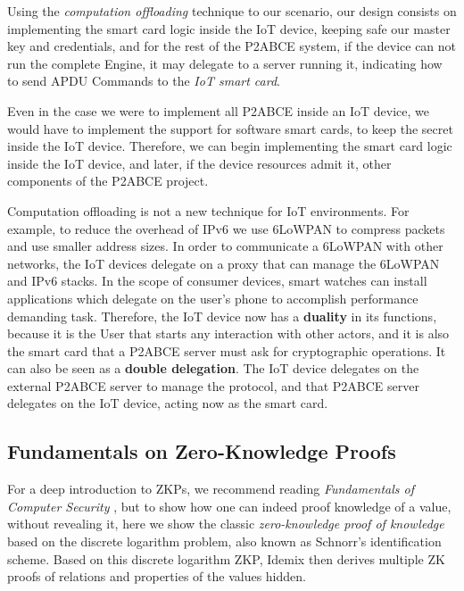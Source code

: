 Using the \textit{computation offloading} technique to our scenario, our design consists on implementing the smart card logic inside the IoT device, keeping safe our master key and credentials, and for the rest of the P2ABCE system, if the device can not run the complete Engine, it may delegate to a server running it, indicating how to send APDU Commands to the \textit{IoT smart card}.

Even in the case we were to implement all P2ABCE inside an IoT device, we would have to implement the support for software smart cards, to keep the secret inside the IoT device. Therefore, we can begin implementing the smart card logic inside the IoT device, and later, if the device resources admit it, other components of the P2ABCE project.


\hfil

Computation offloading is not a new technique for IoT environments. For example, to reduce the overhead of IPv6 we use 6LoWPAN to compress packets and use smaller address sizes. In order to communicate a 6LoWPAN with other networks, the IoT devices delegate on a proxy that can manage the 6LoWPAN and IPv6 stacks. In the scope of consumer devices, smart watches can install applications which delegate on the user's phone to accomplish performance demanding task. 
Therefore, the IoT device now has a \textbf{duality} in its functions, because it is the User that starts any interaction with other actors, and it is also the smart card that a P2ABCE server must ask for cryptographic operations. It can also be seen as a \textbf{double delegation}. The IoT device delegates on the external P2ABCE server to manage the protocol, and that P2ABCE server delegates on the IoT device, acting now as the smart card.

\subsection{Fundamentals on Zero-Knowledge Proofs}


For a deep introduction to ZKPs, we recommend reading \textit{Fundamentals of Computer Security} \cite[Chapter 12]{book:856771}, but to show how one can indeed proof knowledge of a value, without revealing it, here we show the classic \textit{zero-knowledge proof of knowledge} based on the discrete logarithm problem, also known as Schnorr's identification scheme. Based on this discrete logarithm ZKP, Idemix then derives multiple ZK proofs of relations and properties of the values hidden.


